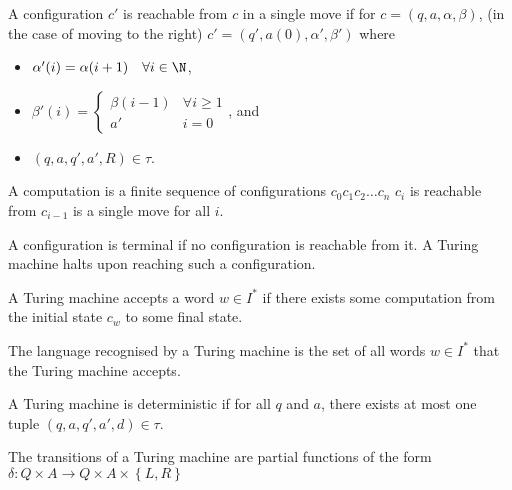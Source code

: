 \documentclass{article}
\begin{document}
\begin{definition}[Reachable]
    A configuration \(c'\) is reachable from \(c\) in a single move if
    for \(c = \left(q, a, \alpha, \beta\right)\),
    (in the case of moving to the right)
    \(c' = \left(q', a(0), \alpha', \beta'\right)\) where
    \begin{itemize}
        \item \(\alpha'(i)=\alpha(i+1) \quad \forall i \in \N\),
        \item \(\beta'(i)=\begin{cases}
            \beta(i-1) & \forall i \ge 1 \\
            a' & i=0
        \end{cases}\), and
        \item \(\left(q, a, q', a', R\right)\in\tau\).
    \end{itemize}
\end{definition}
\begin{definition}[Computation]
    A computation is a finite sequence of configurations
    \(c_0 c_1 c_2 \ldots c_n\) \st
    \(c_i\) is reachable from \(c_{i-1}\) is a single move for all \(i\).
\end{definition}
\begin{definition}[Terminal]
    A configuration is terminal if no configuration is reachable from it.
    A Turing machine halts upon reaching such a configuration.
\end{definition}
\begin{definition}[Acceptinng]
    A Turing machine accepts a word \(w\in I^*\)
    if there exists some computation from the initial state \(c_w\)
    to some final state.
\end{definition}
\begin{definition}[Recognised]
    The language recognised by a Turing machine
    is the set of all words \(w \in I^*\) that the Turing machine accepts.
\end{definition}
\begin{definition}[Deterministic]
    A Turing machine is deterministic if   
    for all \(q\) and \(a\), there exists at most one tuple
    \(\left(q, a, q', a', d\right)\in\tau\).
\end{definition}
\begin{theorem}
    The transitions of a Turing machine are partial functions
    of the form
    \(\delta : Q\times A \to Q \times A \times \left\{L, R\right\}\)
\end{theorem}
\end{document}
